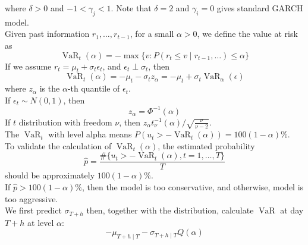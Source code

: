 \documentclass[11pt]{article}
\theoremstyle{definition}
\DeclareMathOperator{\VaR}{VaR}
\begin{document}
where $\delta>0$ and $-1<\gamma_j < 1$. Note that $\delta = 2$ and $\gamma_i = 0$ gives standard GARCH model.\\
Given past information $r_1, \ldots, r_{t-1}$, for a small $\alpha>0$, we define the value at risk as
\[
\VaR_t(\alpha) = - \max\{v: P(r_t\leq v\mid r_{t-1}, \ldots) \leq \alpha\}
\]
If we assume $r_t = \mu_t + \sigma_t \epsilon_t$, and $\epsilon_t\perp \sigma_t$, then
\[
\VaR_t(\alpha) = -\mu_t -\sigma_tz_{\alpha} = -\mu_t +\sigma_t \VaR_\alpha(\epsilon)
\]
where $z_\alpha$ is the $\alpha$-th quantile of $\epsilon_t$.\\
If $\epsilon_t\sim N(0,1)$, then
\[
z_\alpha = \Phi^{-1}(\alpha)
\]
If $t$ distribution with freedom $\nu$, then $z_\alpha t_\nu^{-1}(\alpha)/\sqrt{\frac{\nu}{\nu - 2}}$.\\
The $\VaR_{t}$ with level alpha means $P(u_t>-\VaR_t(\alpha)) = 100(1-\alpha)\%$.\\
To validate the calculation of $\VaR_t(\alpha)$, the estimated probability
\[
\hat{p} = \frac{\#\{u_t>-\VaR_t(\alpha), t = 1,\ldots, T\}}{T}
\]
should be approximately $100(1-\alpha)\%$.\\
If $\hat{p}> 100(1-\alpha)\%$, then the model is too conservative, and otherwise, model is too aggressive.\\
We first predict $\sigma_{T+h}$ then, together with the distribution, calculate $\VaR$ at day $T+h$ at level $\alpha$:
\[
-\mu_{T+h\mid T} - \sigma_{T+h\mid T}Q(\alpha)
\]
\end{document}
